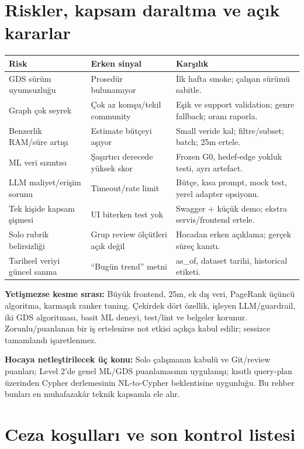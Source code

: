 \documentclass[11pt,a4paper]{article}
\begin{document}
\section{Riskler, kapsam daraltma ve açık kararlar}
\begin{tabularx}{\linewidth}{@{}P{39mm}YY@{}}\toprule
\textbf{Risk} & \textbf{Erken sinyal} & \textbf{Karşılık}\\\midrule
GDS sürüm uyumsuzluğu & Prosedür bulunamıyor & İlk hafta smoke; çalışan sürümü sabitle.\\
Graph çok seyrek & Çok az komşu/tekil community & Eşik ve support validation; genre fallback; oranı raporla.\\
Benzerlik RAM/süre artışı & Estimate bütçeyi aşıyor & Small veride kal; filtre/subset; batch; 25m ertele.\\
ML veri sızıntısı & Şaşırtıcı derecede yüksek skor & Frozen G0, hedef-edge yokluk testi, ayrı artefact.\\
LLM maliyet/erişim sorunu & Timeout/rate limit & Bütçe, kısa prompt, mock test, yerel adapter opsiyonu.\\
Tek kişide kapsam şişmesi & UI biterken test yok & Swagger + küçük demo; ekstra servis/frontend ertele.\\
Solo rubrik belirsizliği & Grup review ölçütleri açık değil & Hocadan erken açıklama; gerçek süreç kanıtı.\\
Tarihsel veriyi güncel sanma & ``Bugün trend'' metni & as\_of, dataset tarihi, historical etiketi.\\\bottomrule
\end{tabularx}

\textbf{Yetişmezse kesme sırası:} Büyük frontend, 25m, ek dış veri, PageRank üçüncü algoritma, karmaşık ranker tuning. Çekirdek dört özellik, işleyen LLM/guardrail, iki GDS algoritması, basit ML deneyi, test/lint ve belgeler korunur. Zorunlu/puanlanan bir iş ertelenirse not etkisi açıkça kabul edilir; sessizce tamamlandı işaretlenmez.

\textbf{Hocaya netleştirilecek üç konu:} Solo çalışmanın kabulü ve Git/review puanları; Level 2'de genel ML/GDS puanlamasının uygulanışı; kısıtlı query-plan üzerinden Cypher derlemesinin NL-to-Cypher beklentisine uygunluğu. Bu rehber bunları en muhafazakâr teknik kapsamla ele alır.

\section{Ceza koşulları ve son kontrol listesi}
\end{document}
